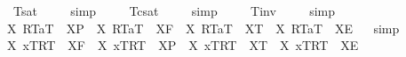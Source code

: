 \begin{isabellebody}
\ \ {\isachardoublequoteopen}{\isacharbrackleft}{\isasymphi}\isactrlsup T{\isacharbrackright}\isactrlsup s\isactrlsup a\isactrlsup t\ {\isacharequal}\ {\isacharasterisk}{\isachardoublequoteclose}%
\isadelimproof
\ %
\endisadelimproof
%
\isatagproof
{}\isamarkupfalse%
\ simp\ \isamarkupfalse%
%
\endisatagproof
{\isafoldproof}%
%
\isadelimproof
%
\endisadelimproof
\isanewline
\ \isamarkupfalse%
\ \ {\isachardoublequoteopen}{\isacharbrackleft}{\isasymphi}\isactrlsup T{\isacharbrackright}\isactrlsup c\isactrlsup s\isactrlsup a\isactrlsup t\ {\isacharequal}\ {\isacharasterisk}{\isachardoublequoteclose}%
\isadelimproof
\ %
\endisadelimproof
%
\isatagproof
{}\isamarkupfalse%
\ simp\ \isamarkupfalse%
%
\endisatagproof
{\isafoldproof}%
%
\isadelimproof
%
\endisadelimproof
\isanewline
\ \isamarkupfalse%
\ \ {\isachardoublequoteopen}{\isacharbrackleft}{\isasymphi}\isactrlsup T{\isacharbrackright}\isactrlsup i\isactrlsup n\isactrlsup v\ {\isacharequal}\ {\isacharasterisk}{\isachardoublequoteclose}%
\isadelimproof
\ %
\endisadelimproof
%
\isatagproof
{}\isamarkupfalse%
\ simp\ \isamarkupfalse%
%
\endisatagproof
{\isafoldproof}%
%
\isadelimproof
%
\endisadelimproof
%
\isamarkuptrue%
\ \isamarkupfalse%
\ {\isachardoublequoteopen}{\isasymexists}X{\isachardot}\ {\isasymlparr}R\isactrlsup T{\isacharcomma}a\isactrlsup T{\isasymrparr}\ {\isacharequal}\ X\isactrlsup P\ {\isasymand}\ {\isasymnot}{\isacharparenleft}{\isasymexists}X{\isachardot}\ {\isasymlparr}R\isactrlsup T{\isacharcomma}a\isactrlsup T{\isasymrparr}\ {\isacharequal}\ X\isactrlsup F{\isacharparenright}\ {\isasymand}\ {\isasymnot}{\isacharparenleft}{\isasymexists}X{\isachardot}\ {\isasymlparr}R\isactrlsup T{\isacharcomma}a\isactrlsup T{\isasymrparr}\ {\isacharequal}\ X\isactrlsup T{\isacharparenright}\ {\isasymand}\ {\isasymnot}{\isacharparenleft}{\isasymexists}X{\isachardot}\ {\isasymlparr}R\isactrlsup T{\isacharcomma}a\isactrlsup T{\isasymrparr}\ {\isacharequal}\ X\isactrlsup E{\isacharparenright}{\isachardoublequoteclose}%
\isadelimproof
\ %
\endisadelimproof
%
\isatagproof
{}\isamarkupfalse%
\ simp\ \isamarkupfalse%
%
\endisatagproof
{\isafoldproof}%
%
\isadelimproof
%
\endisadelimproof
\isanewline
\ \isamarkupfalse%
\ {\isachardoublequoteopen}{\isasymexists}X{\isachardot}\ {\isasymlbrace}x\isactrlsup T{\isacharcomma}R\isactrlsup T{\isasymrbrace}\ {\isacharequal}\ X\isactrlsup F\ {\isasymand}\ {\isasymnot}{\isacharparenleft}{\isasymexists}X{\isachardot}\ {\isasymlbrace}x\isactrlsup T{\isacharcomma}R\isactrlsup T{\isasymrbrace}\ {\isacharequal}\ X\isactrlsup P{\isacharparenright}\ {\isasymand}\ {\isasymnot}{\isacharparenleft}{\isasymexists}X{\isachardot}\ {\isasymlbrace}x\isactrlsup T{\isacharcomma}R\isactrlsup T{\isasymrbrace}\ {\isacharequal}\ X\isactrlsup T{\isacharparenright}\ {\isasymand}\ {\isasymnot}{\isacharparenleft}{\isasymexists}X{\isachardot}\ {\isasymlbrace}x\isactrlsup T{\isacharcomma}R\isactrlsup T{\isasymrbrace}\ {\isacharequal}\ X\isactrlsup E{\isacharparenright}{\isachardoublequoteclose}%

\end{isabellebody}
